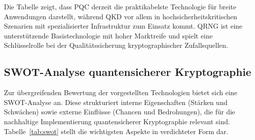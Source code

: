 Die Tabelle zeigt, dass PQC derzeit die praktikabelste Technologie für breite Anwendungen darstellt, während QKD vor allem in hochsicherheitskritischen Szenarien mit spezialisierter Infrastruktur zum Einsatz kommt. QRNG ist eine unterstützende Basistechnologie mit hoher Marktreife und spielt eine Schlüsselrolle bei der Qualitätssicherung kryptographischer Zufallsquellen.

\vspace{2em}

\subsection{SWOT-Analyse quantensicherer Kryptographie}

Zur übergreifenden Bewertung der vorgestellten Technologien bietet sich eine SWOT-Analyse an. Diese strukturiert interne Eigenschaften (Stärken und Schwächen) sowie externe Einflüsse (Chancen und Bedrohungen), die für die nachhaltige Implementierung quantensicherer Kryptographie relevant sind. Tabelle~\ref{tab:swot} stellt die wichtigsten Aspekte in verdichteter Form dar.

